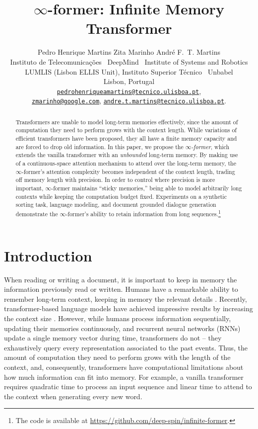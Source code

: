 \documentclass[11pt]{article}
\title{$\infty$-former: Infinite Memory Transformer}
\author{Pedro Henrique Martins\textsuperscript{\Neptune} \quad
        Zita Marinho\textsuperscript{\Moon\Scorpio} \quad
        Andr\'e F.~T. Martins\textsuperscript{\Neptune\Pluto\Saturn} \\
\textsuperscript{\Neptune}Instituto de Telecomunica\c{c}\~oes~
\textsuperscript{\Moon}DeepMind~
\textsuperscript{\Scorpio}Institute of Systems and Robotics\\
\textsuperscript{\Pluto}LUMLIS (Lisbon ELLIS Unit), Instituto Superior T\'ecnico~
\textsuperscript{\Saturn}Unbabel\\
Lisbon, Portugal\\
\href{mailto:pedrohenriqueamartins@tecnico.ulisboa.pt}{\tt pedrohenriqueamartins@tecnico.ulisboa.pt},\\
\href{mailto:zmarinho@google.com}{\tt zmarinho@google.com}, \quad
\href{mailto:andre.martins@unbabel.com}{\tt andre.t.martins@tecnico.ulisboa.pt}.
}
\begin{document}
\maketitle

\begin{abstract}
Transformers are unable to model long-term memories effectively, since the amount of computation they need to perform grows with the context length. 
While variations of efficient transformers have been proposed, they all have a finite memory capacity and are forced to drop old information. 
In this paper, we propose the  \textit{$\infty$-former}, which extends the vanilla transformer with an \emph{unbounded} long-term memory. 
By making use of a continuous-space attention mechanism to attend over the long-term memory, the $\infty$-former's attention complexity becomes independent of the context length, trading off memory length with precision.
In order to control where precision is more important, $\infty$-former maintains ``sticky memories,'' being able to model arbitrarily long contexts while keeping the computation budget fixed.
Experiments on a synthetic sorting task, language modeling, and document grounded dialogue generation demonstrate the $\infty$-former's ability to retain information from long sequences.\footnote{The code is available at \url{https://github.com/deep-spin/infinite-former}.}
\end{abstract}

\section{Introduction}
When reading or writing a document, it is important to keep in memory the information previously read or written. Humans have a remarkable ability to remember long-term context, keeping in memory the relevant details \citep{carroll2007psychology,kuhbandner2020long}.
Recently, transformer-based language models have achieved impressive results by increasing the context size \cite{radford2018improving,radford2019language,dai2019transformer,rae2019compressive,brown2020language}. However, while humans process information sequentially, updating their memories continuously, and recurrent neural networks (RNNs) update a single memory vector during time, transformers do not -- they exhaustively query every representation associated to the past events.
Thus, the amount of computation they need to perform grows with the length of the context, and, consequently, transformers have computational limitations about how much information can fit into memory. For example, a vanilla transformer requires quadratic time to process an input sequence and linear time to attend to the context when generating every new word. 
\end{document}
